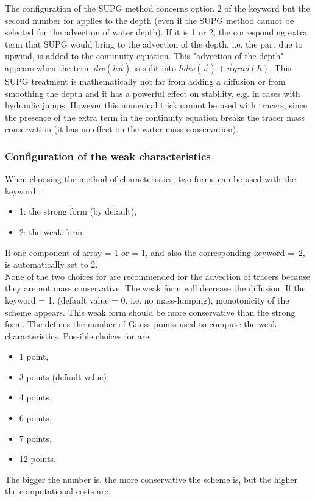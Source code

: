 The configuration of the SUPG method concerns option 2 of the keyword
 but the second number for 
applies to the depth (even if the SUPG method cannot be selected for the
advection of water depth).
If it is 1 or 2, the corresponding extra term that SUPG would bring
to the advection of the depth,
i.e. the part due to upwind, is added to the continuity equation.
This "advection of the depth" appears when the term $div(h\vec{u})$ is split
into $h div(\vec{u}) + \vec{u}grad(h)$.
This SUPG treatment is mathematically not far from adding a diffusion
or from smoothing the depth and it has a powerful effect on stability,
e.g. in cases with hydraulic jumps.
However this numerical trick cannot be used with tracers,
since the presence of the extra term in the continuity equation breaks
the tracer mass conservation (it has no effect on the water mass conservation).

\subsubsection{Configuration of the weak characteristics}

When choosing the method of characteristics, two forms can be used with the
keyword :

\begin{itemize}
\item 1: the strong form (by default),
\item 2: the weak form.
\end{itemize}

If one component of array  = 1 or
 = 1,
and also the corresponding keyword
 =~2,
 is automatically set to 2.\\

None of the two choices for 
are recommended for the advection of tracers because they are not
mass conservative. The weak form will decrease the diffusion. If the keyword
 = 1. (default value = 0. i.e. no
mass-lumping), monotonicity of the scheme appears. This weak form should be
more conservative than the strong form. The  defines the number of Gauss points used to compute the
weak characteristics.
Possible choices for  are:
\begin{itemize}
\item 1 point,
\item 3 points (default value),
\item 4 points,
\item 6 points,
\item 7 points,
\item 12 points.
\end{itemize}
The bigger the number is, the more conservative the scheme is, but the higher the
computational costs are.

